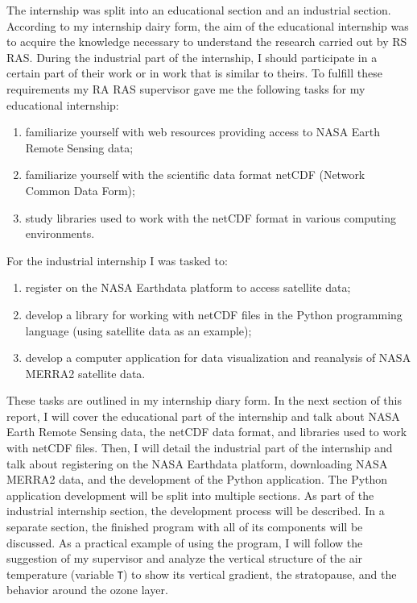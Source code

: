 \documentclass[../00_main.tex]{subfiles}
\begin{document}
The internship was split into an educational section and an industrial section. 
According to my internship dairy form, the aim of the educational internship
was
to acquire the knowledge necessary to understand the research carried out by RS
RAS. During the industrial part of the internship, I should participate in
a certain part of their work or in work that is similar to theirs. To fulfill 
these requirements my RA RAS supervisor gave me the following tasks for my 
educational internship:
\begin{enumerate}
    \item familiarize yourself with web resources providing access to NASA 
        Earth Remote Sensing data;
    \item familiarize yourself with the scientific data format netCDF (Network
        Common Data Form);
    \item study libraries used to work with the netCDF format in various 
        computing environments.
\end{enumerate}
For the industrial internship I was tasked to:
\begin{enumerate}
    \item register on the NASA Earthdata platform to access satellite data;
    \item develop a library for working with netCDF files in the Python
        programming language (using satellite data as an example);
    \item develop a computer application for data visualization and reanalysis 
        of NASA MERRA2 satellite data.
\end{enumerate}
These tasks are outlined in my internship diary form. In the next section of
this report, I will cover the educational part of the internship and talk about NASA
Earth Remote Sensing data, the netCDF data format, and libraries used to work
with netCDF files. \newline
Then, I will detail the industrial part of the internship
and talk about registering on the NASA Earthdata platform, downloading NASA
MERRA2 data, and the development of the Python application. The Python
application development will be split into multiple sections. As part of the
industrial internship section, the development process will be described. In
a separate section, the finished program with all of its components will be
discussed. \newline
As a practical example of using the program, I will follow the
suggestion of my supervisor and analyze the vertical structure of the air
temperature (variable \texttt{T}) to show its vertical gradient, the
stratopause, and the behavior around the ozone layer. 
\end{document}
